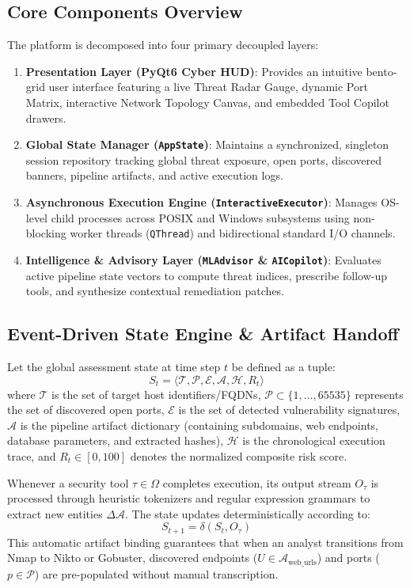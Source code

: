 \documentclass[conference]{IEEEtran}
\begin{document}
\subsection{Core Components Overview}
The platform is decomposed into four primary decoupled layers:
\begin{enumerate}
    \item \textbf{Presentation Layer (PyQt6 Cyber HUD)}: Provides an intuitive bento-grid user interface featuring a live Threat Radar Gauge, dynamic Port Matrix, interactive Network Topology Canvas, and embedded Tool Copilot drawers.
    \item \textbf{Global State Manager (\texttt{AppState})}: Maintains a synchronized, singleton session repository tracking global threat exposure, open ports, discovered banners, pipeline artifacts, and active execution logs.
    \item \textbf{Asynchronous Execution Engine (\texttt{InteractiveExecutor})}: Manages OS-level child processes across POSIX and Windows subsystems using non-blocking worker threads (\texttt{QThread}) and bidirectional standard I/O channels.
    \item \textbf{Intelligence \& Advisory Layer (\texttt{MLAdvisor} \& \texttt{AICopilot})}: Evaluates active pipeline state vectors to compute threat indices, prescribe follow-up tools, and synthesize contextual remediation patches.
\end{enumerate}

\subsection{Event-Driven State Engine \& Artifact Handoff}
Let the global assessment state at time step $t$ be defined as a tuple:
\begin{equation}
S_t = \langle \mathcal{T}, \mathcal{P}, \mathcal{E}, \mathcal{A}, \mathcal{H}, R_t \rangle
\end{equation}
where $\mathcal{T}$ is the set of target host identifiers/FQDNs, $\mathcal{P} \subset \{1, \dots, 65535\}$ represents the set of discovered open ports, $\mathcal{E}$ is the set of detected vulnerability signatures, $\mathcal{A}$ is the pipeline artifact dictionary (containing subdomains, web endpoints, database parameters, and extracted hashes), $\mathcal{H}$ is the chronological execution trace, and $R_t \in [0, 100]$ denotes the normalized composite risk score.

Whenever a security tool $\tau \in \Omega$ completes execution, its output stream $O_\tau$ is processed through heuristic tokenizers and regular expression grammars to extract new entities $\Delta \mathcal{A}$. The state updates deterministically according to:
\begin{equation}
S_{t+1} = \delta(S_t, O_\tau)
\end{equation}
This automatic artifact binding guarantees that when an analyst transitions from Nmap to Nikto or Gobuster, discovered endpoints ($U \in \mathcal{A}_{\text{web\_urls}}$) and ports ($p \in \mathcal{P}$) are pre-populated without manual transcription.
\end{document}
